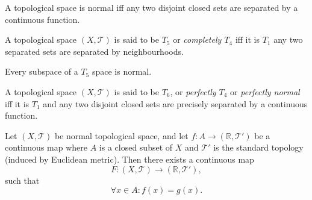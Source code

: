 \begin{proposition}
	\label{prop: urysohn's lemma}
	A topological space is normal iff any two disjoint closed sets are separated by a continuous function.
\end{proposition}


\begin{definition}
	[$T_5$ spaces]
	\label{def: T_5 spaces}
	A topological space $(X, \mathcal T)$ is said to be $T_5$ or \textit{completely $T_4$} iff it is $T_1$ any two separated sets are separated by neighbourhoods.
\end{definition}


\begin{proposition}
	Every subspace of a $T_5$ space is normal.
\end{proposition}


\begin{definition}
	[$T_6$ spaces]
	\label{def: T_6 spaces}
	A topological space $(X, \mathcal T)$ is said to be $T_6$, or \textit{perfectly $T_4$} or \textit{perfectly normal} iff it is $T_1$ and any two disjoint closed sets are precisely separated by a continuous function.
\end{definition}



\begin{proposition}
	\label{prop: Tietze extension theorem}
	Let $(X, \mathcal T)$ be normal topological space, and let $f: A \to (\mathbb R, \mathcal T')$ be a continuous map where $A$ is a closed subset of $X$ and $\mathcal T'$ is the standard topology (induced by Euclidean metric). Then there exists a continuous map
	$$
	F: (X, \mathcal T) \to (\mathbb R, \mathcal T'),
	$$
	such that
	$$
	\forall x \in A: f(x) = g(x).
	$$
\end{proposition}







































%